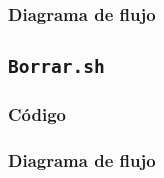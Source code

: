 \documentclass[12pt,letterpaper]{article}
\begin{document}
\subsubsection{Diagrama de flujo}


\subsection{\texttt{Borrar.sh}}
\subsubsection{Código}

\subsubsection{Diagrama de flujo}



\end{document}
